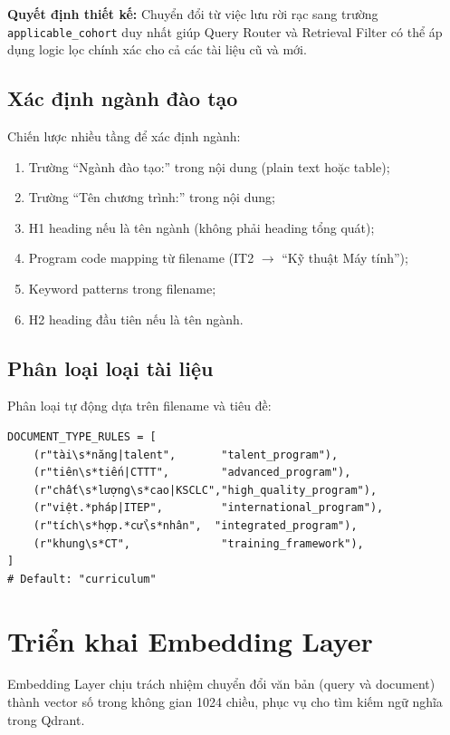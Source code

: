 \documentclass[../DoAn.tex]{subfiles}
\begin{document}
\textbf{Quyết định thiết kế:} Chuyển đổi từ việc lưu rời rạc sang trường \texttt{applicable\_cohort} duy nhất giúp Query Router và Retrieval Filter có thể áp dụng logic lọc chính xác cho cả các tài liệu cũ và mới.

\subsection{Xác định ngành đào tạo}
Chiến lược nhiều tầng để xác định ngành:
\begin{enumerate}
    \item Trường ``Ngành đào tạo:'' trong nội dung (plain text hoặc table);
    \item Trường ``Tên chương trình:'' trong nội dung;
    \item H1 heading nếu là tên ngành (không phải heading tổng quát);
    \item Program code mapping từ filename (IT2 $\rightarrow$ ``Kỹ thuật Máy tính'');
    \item Keyword patterns trong filename;
    \item H2 heading đầu tiên nếu là tên ngành.
\end{enumerate}

\subsection{Phân loại loại tài liệu}
Phân loại tự động dựa trên filename và tiêu đề:
\begin{verbatim}
DOCUMENT_TYPE_RULES = [
    (r"tài\s*năng|talent",       "talent_program"),
    (r"tiên\s*tiến|CTTT",        "advanced_program"),
    (r"chất\s*lượng\s*cao|KSCLC","high_quality_program"),
    (r"việt.*pháp|ITEP",         "international_program"),
    (r"tích\s*hợp.*cử\s*nhân",  "integrated_program"),
    (r"khung\s*CT",              "training_framework"),
]
# Default: "curriculum"
\end{verbatim}


\section{Triển khai Embedding Layer}

Embedding Layer chịu trách nhiệm chuyển đổi văn bản (query và document) thành vector số trong không gian 1024 chiều, phục vụ cho tìm kiếm ngữ nghĩa trong Qdrant.
\end{document}
